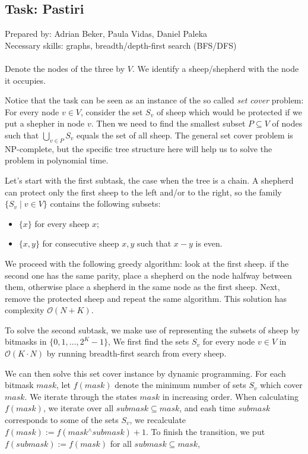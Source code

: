 \subsection*{Task: Pastiri}
\textsf{Prepared by: Adrian Beker, Paula Vidas, Daniel Paleka}\\
\textsf{Necessary skills: graphs, breadth/depth-first search (BFS/DFS)}
\\\\

Denote the nodes of the three by $V$.
We identify a sheep/shepherd with the node it occupies. 

Notice that the task can be seen as an instance of the so
called \textit{set cover} problem: 
For every node $v \in V$, consider the set $S_v$ of sheep which would be
protected if we put a shepher in node $v$. Then we need to find the smallest subset $P \subseteq V$ of
nodes such that $\bigcup_{v \in P} S_v$ equals the set of all sheep.
The general set cover problem is NP-complete, but the specific tree structure
here will help us to solve the problem in polynomial time.

Let's start with the first subtask, the case when the tree is a chain. A
shepherd can protect only the first sheep to the left and/or to the right, so
the family $\{S_v \mid v \in V\}$ contains the following subsets:
\begin{itemize}
    \item $\{x\}$ for every sheep $x$;
    \item $\{x, y\}$ for consecutive sheep $x, y$ such that $x-y$ is even. 
\end{itemize}
We proceed with the following greedy algorithm: look at the first
sheep. if the second one has the same parity, place a shepherd on the node
halfway between them, otherwise place a shepherd in the same node as the first
sheep. Next, remove the protected sheep and repeat the same algorithm.
This solution has complexity $\mathcal{O}(N + K)$.

To solve the second subtask, we make use of representing 
the subsets of sheep by bitmasks in $\{0, 1, \ldots, 2^K - 1\}$, We first find
the sets $S_v$ for every node $v \in V$ in $\mathcal{O}(K \cdot N)$ 
by running breadth-first search from every sheep.

We can then solve this set cover instance by dynamic programming.
For each bitmask $mask$, let $f(mask)$ denote the minimum number of sets $S_v$
which cover $mask$.
We iterate through the states $mask$ in increasing order. When calculating
$f(mask)$, we iterate over all $submask \subseteq mask$, and eash time $submask$
corresponds to some of the sets $S_v$, we recalculate 
$f(mask) := f(mask \mathbin{^\wedge} submask) + 1$.  
To finish the transition, we put $f(submask) := f(mask)$ 
for all $submask \subseteq mask$, 

